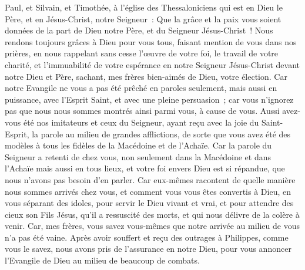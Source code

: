 \begin{multicols}{2}
\VerseOne{}Paul, et Silvain, et Timothée, à l'église des Thessaloniciens qui est en Dieu le Père, et en Jésus-Christ, notre Seigneur~: Que la grâce et la paix vous soient données de la part de Dieu notre Père, et du Seigneur Jésus-Christ~!
Nous rendons toujours grâces à Dieu pour vous tous, faisant mention de vous dans nos prières,
en nous rappelant sans cesse l'œuvre de votre foi, le travail de votre charité, et l'immuabilité de votre espérance en notre Seigneur Jésus-Christ devant notre Dieu et Père,
sachant, mes frères bien-aimés de Dieu, votre élection.
Car notre Evangile ne vous a pas été prêché en paroles seulement, mais aussi en puissance, avec l'Esprit Saint, et avec une pleine persuasion~; car vous n'ignorez pas que nous nous sommes montrés ainsi parmi vous, à cause de vous.
Aussi avez-vous été nos imitateurs et ceux du Seigneur, ayant reçu avec la joie du Saint-Esprit, la parole au milieu de grandes afflictions,
de sorte que vous avez été des modèles à tous les fidèles de la Macédoine et de l'Achaïe.
Car la parole du Seigneur a retenti de chez vous, non seulement dans la Macédoine et dans l'Achaïe mais aussi en tous lieux, et votre foi envers Dieu est si répandue, que nous n'avons pas besoin d'en parler.
Car eux-mêmes racontent de quelle manière nous sommes arrivés chez vous, et comment vous vous êtes convertis à Dieu, en vous séparant des idoles, pour servir le Dieu vivant et vrai,
et pour attendre des cieux son Fils Jésus, qu'il a ressuscité des morts, et qui nous délivre de la colère à venir.
\VerseOne{}Car, mes frères, vous savez vous-mêmes que notre arrivée au milieu de vous n'a pas été vaine. 
Après avoir souffert et reçu des outrages à Philippes, comme vous le savez, nous avons pris de l'assurance en notre Dieu, pour vous annoncer l'Evangile de Dieu au milieu de beaucoup de combats.

\end{multicols}
